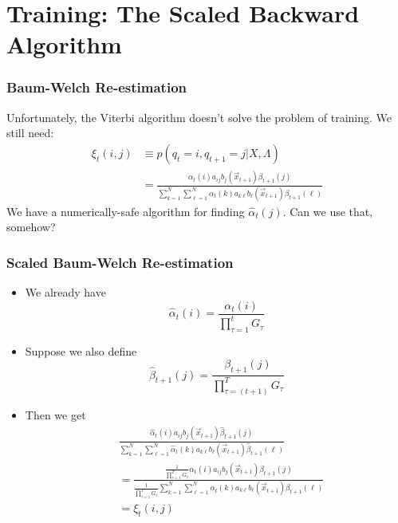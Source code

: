 \documentclass{beamer}
\begin{document}
\section[Training]{Training: The Scaled Backward Algorithm}
\setcounter{subsection}{1}

\begin{frame}
  \frametitle{Baum-Welch Re-estimation}

  Unfortunately, the Viterbi algorithm doesn't solve the problem of
  training.  We still need:
  \begin{align*}
    \xi_t(i,j) &\equiv p(q_t=i,q_{t+1}=j|X,\Lambda)\\
    &= \frac{\alpha_t(i)a_{ij}b_j(\vec{x}_{t+1})\beta_{t+1}(j)}
       {\sum_{k=1}^N\sum_{\ell=1}^N \alpha_t(k)a_{k\ell}b_\ell(\vec{x}_{t+1})\beta_{t+1}(\ell)}
  \end{align*}
  We have a numerically-safe algorithm for finding $\hat\alpha_t(j)$.
  Can we use that, somehow?
\end{frame}

\begin{frame}
  \frametitle{Scaled Baum-Welch Re-estimation}

  \begin{itemize}
  \item We already have
    \begin{displaymath}
      \hat\alpha_t(i) = \frac{\alpha_t(i)}{\prod_{\tau=1}^{t} G_\tau} 
    \end{displaymath}
  \item Suppose we also define
    \begin{displaymath}
      \hat\beta_{t+1}(j) = \frac{\beta_{t+1}(j)}{\prod_{\tau=(t+1)}^T G_\tau}
    \end{displaymath}
  \item Then we get
    \begin{align*}
      &\frac{\hat\alpha_t(i)a_{ij}b_j(\vec{x}_{t+1})\hat\beta_{t+1}(j)}{\sum_{k=1}^N\sum_{\ell=1}^N \hat\alpha_t(k)a_{k\ell}b_\ell(\vec{x}_{t+1})\hat\beta_{t+1}(\ell)}\\
      &= \frac{\frac{1}{\prod_{\tau=1}^TG_\tau}\alpha_t(i)a_{ij}b_j(\vec{x}_{t+1})\beta_{t+1}(j)}{\frac{1}{\prod_{\tau=1}^TG_\tau}\sum_{k=1}^N\sum_{\ell=1}^N\alpha_t(k)a_{k\ell}b_\ell(\vec{x}_{t+1})\beta_{t+1}(\ell)}\\
      &= \xi_t(i,j)
    \end{align*}
  \end{itemize}
\end{frame}
  
\end{document}
